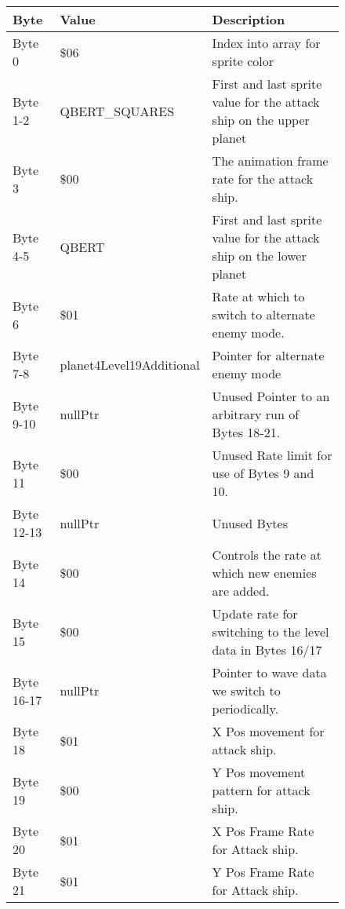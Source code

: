 \begin{figure}[H]
{\begin{adjustbox}{width=12cm}
\begin{tabular}{lll}
\toprule
 Byte       & Value                    & Description                                                         \\
\midrule
 Byte 0     & \$06                      & Index into array for sprite color                                   \\
 Byte 1-2   & QBERT\_SQUARES            & First and last sprite value for the attack ship on the upper planet \\
 Byte 3     & \$00                      & The animation frame rate for the attack ship.                       \\
 Byte 4-5   & QBERT                    & First and last sprite value for the attack ship on the lower planet \\
 Byte 6     & \$01                      & Rate at which to switch to alternate enemy mode.                    \\
 Byte 7-8   & planet4Level19Additional & Pointer for alternate enemy mode                                    \\
 Byte 9-10  & nullPtr                  & Unused Pointer to an arbitrary run of Bytes 18-21.                  \\
 Byte 11    & \$00                      & Unused Rate limit for use of Bytes 9 and 10.                        \\
 Byte 12-13 & nullPtr                  & Unused Bytes                                                        \\
 Byte 14    & \$00                      & Controls the rate at which new enemies are added.                   \\
 Byte 15    & \$00                      & Update rate for switching to the level data in Bytes 16/17          \\
 Byte 16-17 & nullPtr                  & Pointer to wave data we switch to periodically.                     \\
 Byte 18    & \$01                      & X Pos movement for attack ship.                                     \\
 Byte 19    & \$00                      & Y Pos movement pattern for attack ship.                             \\
 Byte 20    & \$01                      & X Pos Frame Rate for Attack ship.                                   \\
 Byte 21    & \$01                      & Y Pos Frame Rate for Attack ship.                                   \\

\end{tabular}
\end{adjustbox}}
\end{figure}
